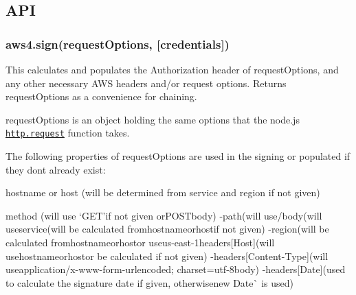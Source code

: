 \subsection*{A\+PI }

\subsubsection*{aws4.\+sign(request\+Options, \mbox{[}credentials\mbox{]})}

This calculates and populates the {\ttfamily Authorization} header of {\ttfamily request\+Options}, and any other necessary A\+WS headers and/or request options. Returns {\ttfamily request\+Options} as a convenience for chaining.

{\ttfamily request\+Options} is an object holding the same options that the node.\+js \href{http://nodejs.org/docs/latest/api/http.html#http_http_request_options_callback}{\tt http.\+request} function takes.

The following properties of {\ttfamily request\+Options} are used in the signing or populated if they don\textquotesingle{}t already exist\+:


\begin{DoxyItemize}
\item {\ttfamily hostname} or {\ttfamily host} (will be determined from {\ttfamily service} and {\ttfamily region} if not given)
\item {\ttfamily method} (will use `\textquotesingle{}G\+ET'{\ttfamily if not given or}\textquotesingle{}P\+O\+STbody{\ttfamily ) -\/}path{\ttfamily (will use}\textquotesingle{}/body{\ttfamily (will use}\textquotesingle{}service{\ttfamily (will be calculated from}hostname{\ttfamily or}host{\ttfamily if not given) -\/}region{\ttfamily (will be calculated from}hostname{\ttfamily or}host{\ttfamily or use}\textquotesingle{}us-\/east-\/1headers\mbox{[}\textquotesingle{}Host\textquotesingle{}\mbox{]}{\ttfamily (will use}hostname{\ttfamily or}host{\ttfamily or be calculated if not given) -\/}headers\mbox{[}\textquotesingle{}Content-\/\+Type\textquotesingle{}\mbox{]}{\ttfamily (will use}\textquotesingle{}application/x-\/www-\/form-\/urlencoded; charset=utf-\/8body{\ttfamily ) -\/}headers\mbox{[}\textquotesingle{}Date\textquotesingle{}\mbox{]}{\ttfamily (used to calculate the signature date if given, otherwise}new Date\`{} is used)
\end{DoxyItemize}

